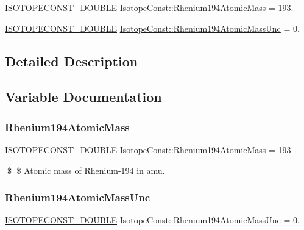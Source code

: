\begin{DoxyCompactItemize}
\item 
\mbox{\hyperlink{group___isotope_const-_macros_ga8f45a7272ce02c0b4c65c44636ed719a}{I\+S\+O\+T\+O\+P\+E\+C\+O\+N\+S\+T\+\_\+\+D\+O\+U\+B\+LE}} \mbox{\hyperlink{group___isotope_const-_rhenium-_re194_gaf19d419c6e718505a7a365136ff94524}{Isotope\+Const\+::\+Rhenium194\+Atomic\+Mass}} = 193.
\item 
\mbox{\hyperlink{group___isotope_const-_macros_ga8f45a7272ce02c0b4c65c44636ed719a}{I\+S\+O\+T\+O\+P\+E\+C\+O\+N\+S\+T\+\_\+\+D\+O\+U\+B\+LE}} \mbox{\hyperlink{group___isotope_const-_rhenium-_re194_gad2e390b0a2f27b1b99e6472a2d3edca8}{Isotope\+Const\+::\+Rhenium194\+Atomic\+Mass\+Unc}} = 0.
\end{DoxyCompactItemize}


\subsection{Detailed Description}


\subsection{Variable Documentation}
\mbox{\label{group___isotope_const-_rhenium-_re194_gaf19d419c6e718505a7a365136ff94524}} 
\subsubsection{\texorpdfstring{Rhenium194\+Atomic\+Mass}{Rhenium194AtomicMass}}
{\footnotesize\ttfamily \mbox{\hyperlink{group___isotope_const-_macros_ga8f45a7272ce02c0b4c65c44636ed719a}{I\+S\+O\+T\+O\+P\+E\+C\+O\+N\+S\+T\+\_\+\+D\+O\+U\+B\+LE}} Isotope\+Const\+::\+Rhenium194\+Atomic\+Mass = 193.}

\$ \$ Atomic mass of Rhenium-\/194 in amu. \mbox{\label{group___isotope_const-_rhenium-_re194_gad2e390b0a2f27b1b99e6472a2d3edca8}} 
\subsubsection{\texorpdfstring{Rhenium194\+Atomic\+Mass\+Unc}{Rhenium194AtomicMassUnc}}
{\footnotesize\ttfamily \mbox{\hyperlink{group___isotope_const-_macros_ga8f45a7272ce02c0b4c65c44636ed719a}{I\+S\+O\+T\+O\+P\+E\+C\+O\+N\+S\+T\+\_\+\+D\+O\+U\+B\+LE}} Isotope\+Const\+::\+Rhenium194\+Atomic\+Mass\+Unc = 0.}

